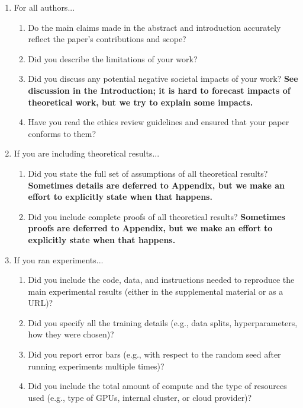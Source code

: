 \documentclass[11pt]{article} %
\begin{document}
\begin{enumerate}
	
	\item For all authors...
	\begin{enumerate}
		\item Do the main claims made in the abstract and introduction accurately reflect the paper's contributions and scope?
		\answerYes{}
		\item Did you describe the limitations of your work?
		\answerYes{}
		\item Did you discuss any potential negative societal impacts of your work?
		\answerYes{} \textbf{See discussion in the Introduction; it is hard to forecast impacts of theoretical work, but we try to explain some impacts.}
		\item Have you read the ethics review guidelines and ensured that your paper conforms to them?
		\answerYes{}
	\end{enumerate}
	
	\item If you are including theoretical results...
	\begin{enumerate}
		\item Did you state the full set of assumptions of all theoretical results?
		\answerYes{}\textbf{Sometimes details are deferred to Appendix, but we make an effort to explicitly state when that happens.}
		\item Did you include complete proofs of all theoretical results?
		\answerYes{}\textbf{Sometimes proofs are deferred to Appendix, but we make an effort to explicitly state when that happens.}
	\end{enumerate}
	
	\item If you ran experiments...
	\begin{enumerate}
		\item Did you include the code, data, and instructions needed to reproduce the main experimental results (either in the supplemental material or as a URL)?
		\answerNA{}
		\item Did you specify all the training details (e.g., data splits, hyperparameters, how they were chosen)?
		\answerNA{}
		\item Did you report error bars (e.g., with respect to the random seed after running experiments multiple times)?
		\answerNA{}
		\item Did you include the total amount of compute and the type of resources used (e.g., type of GPUs, internal cluster, or cloud provider)?
		\answerNA{}
	\end{enumerate}
	

\end{enumerate}
\end{document}
